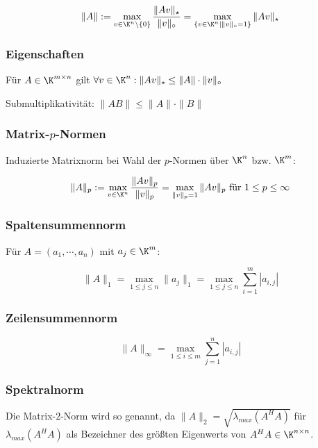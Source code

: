 \vspace*{-4mm}
$$\|A\| := \max_{v \in \K^n \setminus \{0\}} \frac{\|Av\|_\star}{\|v\|_\circ} = \max_{\{v \in \K^n | \|v\|_\circ = 1 \}} \|Av\|_\star$$

\subsubsection*{Eigenschaften}

Für $A \in \K^{m \times n}$ gilt $\forall v \in \K^n : \|Av\|_\star \leq \|A\| \cdot \|v\|_\circ$

Submultiplikativität: $\|AB\| \leq \|A\| \cdot \|B\|$

\subsubsection*{Matrix-$p$-Normen}

Induzierte Matrixnorm bei Wahl der $p$-Normen über $\K^n$ bzw. $\K^m$:

\vspace*{-4mm}
$$\|A\|_p := \max_{v \in \K^n} \frac{\|Av\|_p}{\|v\|_p} = \max_{\|v\|_p = 1} \|Av\|_p \text{ für } 1 \leq p \leq \infty$$

\subsubsection*{Spaltensummennorm}

Für $A = (a_1, \cdots, a_n)$ mit $a_j \in \K^m$:

\vspace*{-4mm}
$$\|A\|_1 = \max_{1 \leq j \leq n} \|a_j\|_1 = \max_{1 \leq j \leq n} \sum_{i=1}^m |a_{i,j}|$$

\subsubsection*{Zeilensummennorm}

\vspace*{-4mm}
$$\|A\|_\infty = \max_{1 \leq i \leq m} \sum_{j=1}^n |a_{i,j}|$$

\subsubsection*{Spektralnorm}

Die Matrix-$2$-Norm wird so genannt, da $\|A\|_2 = \sqrt{\lambda_{max}(A^H A)}$ für $\lambda_{max}(A^H A)$ als Bezeichner des größten Eigenwerts von $A^H A \in \K^{n \times n}$.

